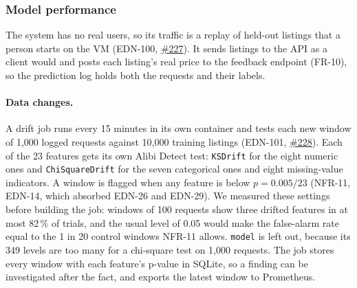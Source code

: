 \subsubsection{Model performance}
\label{sec:m6-model-performance}

The system has no real users, so its traffic is a replay of held-out listings that a person starts on the VM (EDN-100, \href{https://github.com/mlops-2627q1-mds-upc/MLOPS_Recommenditos/issues/227}{\#227}).
It sends listings to the API as a client would and posts each listing's real price to the feedback endpoint (FR-10), so the prediction log holds both the requests and their labels.

\paragraph{Data changes.}
A drift job runs every 15 minutes in its own container and tests each new window of 1,000 logged requests against 10,000 training listings (EDN-101, \href{https://github.com/mlops-2627q1-mds-upc/MLOPS_Recommenditos/issues/228}{\#228}).
Each of the 23 features gets its own Alibi Detect test: \texttt{KSDrift} for the eight numeric ones and \texttt{ChiSquareDrift} for the seven categorical ones and eight missing-value indicators.
A window is flagged when any feature is below $p = 0.005/23$ (NFR-11, EDN-14, which absorbed EDN-26 and EDN-29).
We measured these settings before building the job: windows of 100 requests show three drifted features in at most 82\,\% of trials, and the usual level of 0.05 would make the false-alarm rate equal to the 1 in 20 control windows NFR-11 allows.
\texttt{model} is left out, because its 349 levels are too many for a chi-square test on 1,000 requests.
The job stores every window with each feature's p-value in SQLite, so a finding can be investigated after the fact, and exports the latest window to Prometheus.

